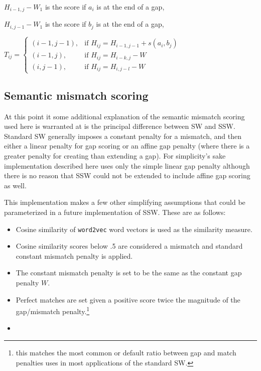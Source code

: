 {\begin{algorithm}[t]
{$H_{i-1,j}-W_{1}$ is the score if $a_{i}$ is at the end of a gap,

$H_{i,j-1}-W_{1}$ is the score if $b_{j}$ is at the end of a gap,


\vspace{10pt}

 ${\displaystyle T_{ij}={\begin{cases}    (i-1,j-1), & \text{if } H_{ij} = H_{i-1,j-1}+s(a_{i},b_{j}) \\
    (i-1,j), & \text{if } H_{ij} = H_{i-k,j}-W \\
    (i,j-1), & \text{if } H_{ij} = H_{i,j-l}-W
    \end{cases}}}$
}



\caption{Semantic Smith Waterman\protect\footnotemark}
\label{alg:one}
\end{algorithm}

\subsection{Semantic mismatch scoring}
At this point it some additional explanation of the semantic mismatch scoring used here is warranted at is the principal difference between SW and SSW. Standard SW generally imposes a constant penalty for a mismatch, and then either a linear penalty for gap scoring or an affine gap penalty (where there is a greater penalty for creating than extending a gap). For simplicity's sake implementation described here uses only the simple linear gap penalty although there is no reason that SSW could not be extended to include affine gap scoring as well.

This implementation makes a few other simplifying assumptions that could be parameterized in a future implementation of SSW. These are as follows:

\begin{itemize}
\item Cosine similarity of \texttt{word2vec} word vectors is used as the similarity measure.
\item Cosine similarity scores below .5 are considered a mismatch and standard constant mismatch penalty is applied.
\item The constant mismatch penalty is set to be the same as the constant gap penalty $W$.
\item Perfect matches are set given a positive score twice the magnitude of the gap/mismatch penalty.\footnote{this matches the most common or default ratio between gap and match penalties uses in most applications of the standard SW.}
\item
\end{itemize}
  
}
